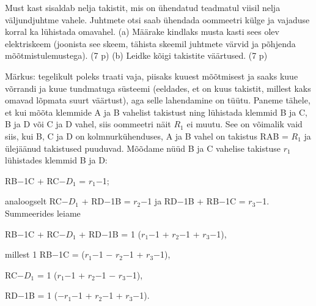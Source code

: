 
Must kast sisaldab nelja takistit, mis on ühendatud teadmatul viisil nelja väljundjuhtme vahele. Juhtmete otsi saab ühendada oommeetri külge ja vajaduse korral ka lühistada omavahel. (a) Määrake kindlaks musta kasti sees olev elektriskeem (joonista see skeem, tähista skeemil juhtmete värvid ja põhjenda mõõtmistulemustega). (7 p) (b) Leidke kõigi takistite väärtused. (7 p)

\hint

\solu
Märkus: tegelikult poleks traati vaja, piisaks kuuest mõõtmisest ja saaks kuue võrrandi ja kuue tundmatuga süsteemi (eeldades, et on kuus takistit, millest kaks omavad lõpmata suurt väärtust), aga selle lahendamine on tüütu. Paneme tähele, et kui mõõta klemmide A ja B vahelist takistust ning lühistada klemmid B ja C, B ja D või C ja D vahel, siis oommeetri näit $R_1$ ei muutu. See on võimalik vaid siis, kui B, C ja D on kolmnurkühenduses, A ja B vahel on takistus RAB = $R_1$ ja ülejäänud takistused puuduvad. Mõõdame nüüd B ja C vahelise takistuse $r_1$ lühistades klemmid B ja D:

RB$-$1C + RC$-$$D_1$ = $r_1$$-$1;

analoogselt RC$-$$D_1$ + RD$-$1B = $r_2$$-$1 ja RD$-$1B + RB$-$1C = $r_3$$-$1. Summeerides leiame

RB$-$1C + RC$-$$D_1$ + RD$-$1B = 1 ($r_1$$-$1 + $r_2$$-$1 + $r_3$$-$1),

millest 1 RB$-$1C = ($r_1$$-$1 $-$ $r_2$$-$1 + $r_3$$-$1),

RC$-$$D_1$ = 1 ($r_1$$-$1 + $r_2$$-$1 $-$ $r_3$$-$1),

RD$-$1B = 1 ($-$$r_1$$-$1 + $r_2$$-$1 + $r_3$$-$1).
\probend
